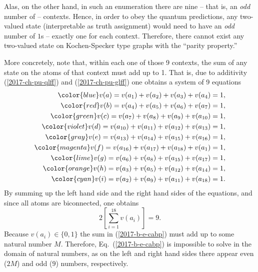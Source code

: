 Alas, on the other hand, in such an enumeration
there are nine  -- that is, an {\em odd} number of -- contexts.
Hence,
in order to obey the quantum predictions,
any  two-valued state (interpretable as truth assignment)
would need to have an {\em odd} number of $1$s -- exactly one for each context.
Therefore, there cannot exist any two-valued state on Kochen-Specker type graphs with the  ``parity property.''

More concretely,  note that, within each one of those 9 contexts,
the sum of any state on the atoms of that context must add up to 1.
That is, due to additivity (\ref{2017-ch-pu-qlff}) and (\ref{2017-ch-pu-glff})
one obtains a system of 9 equations
\begin{equation}
\begin{split}
\color{blue}        v(a)= v( a_1 ) + v( a_2 ) + v( a_3 ) + v( a_4 ) = 1 ,                  \\
\color{red}         v(b)= v( a_4 ) + v( a_5 ) + v( a_6 ) + v( a_7 ) = 1 ,                  \\
\color{green}       v(c)= v( a_7 ) + v( a_8 ) + v( a_9 ) + v( a_{10} ) = 1 ,               \\
\color{violet}      v(d)= v( a_{10} ) + v( a_{11} ) + v( a_{12} ) + v( a_{13} ) = 1 ,      \\
\color{gray}        v(e)= v( a_{13} ) + v( a_{14} ) + v( a_{15} ) + v( a_{16} ) = 1 ,      \\
\color{magenta}     v(f)= v( a_{16} ) + v( a_{17} ) + v( a_{18} ) + v( a_1 ) = 1 ,         \\
\color{lime}        v(g)= v( a_6 ) + v( a_8 ) + v( a_{15} ) + v( a_{17} ) = 1 ,            \\
\color{orange}      v(h)= v( a_3 ) + v( a_5 ) + v( a_{12} ) + v( a_{14} ) = 1 ,            \\
\color{cyan}        v(i)= v( a_2 ) + v( a_9 ) + v( a_{11} ) + v( a_{18} ) = 1 .
\label{2017-b-e-cabp-conf}
\end{split}
\end{equation}
By summing up the left hand side and the right hand sides of the equations, and since all atoms are biconnected,
one obtains
\begin{equation}
2 \left[\sum_{i=1}^{18} v(a_i)\right] = 9.
\label{2017-b-e-cabp}
\end{equation}
Because $v(a_i)\in \{0,1\}$ the sum in (\ref{2017-b-e-cabp}) must add up to some natural number $M$.
Therefore, Eq.~(\ref{2017-b-e-cabp}) is impossible to solve in the domain of natural numbers,
as on the left and right hand sides there appear even ($2M$) and odd ($9$) numbers, respectively.


